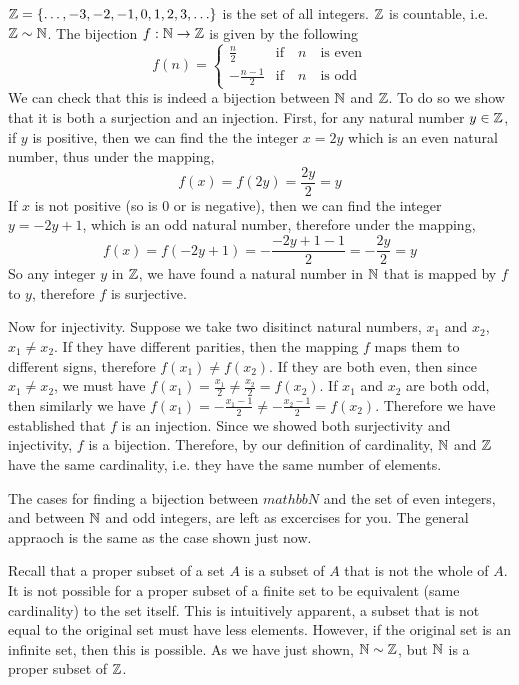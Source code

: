 \documentclass[../../templates/section]{subfiles}
\begin{document}
\begin{example}
$\mathbb{Z} = \{\ldots, -3, -2, -1, 0, 1, 2, 3, \ldots\}$ is the set of all integers.
$\mathbb{Z}$ is countable, i.e. $\mathbb{Z} \sim \mathbb{N}$. The bijection $f:\mathbb{N} \rightarrow \mathbb{Z}$ is
given by the following
\[ 
f(n) =
\begin{cases} 
    \frac{n}{2}      & \text{if} \quad n \quad \text{is even} \\
    -\frac{n - 1}{2} & \text{if} \quad n \quad \text{is odd}
\end{cases}
\]
We can check that this is indeed a bijection between $\mathbb{N}$ and $\mathbb{Z}$.  To do so
we show that it is both a surjection and an injection. First, for any natural
number $y\in \mathbb{Z}$, if $y$ is positive, then we can find the the integer $x = 2y$
which is an even natural number, thus under the mapping,
\[
f(x) = f(2y) = \frac{2y}{2} = y
\]
If $x$ is not positive (so is 0 or is negative), then we can find the integer
$y = -2y + 1$, which is an odd natural number, therefore under the mapping,
\[
f(x) = f(-2y + 1) = -\frac{-2y + 1 - 1}{2} = -\frac{2y}{2} = y
\]
So any integer $y$ in $\mathbb{Z}$, we have found a natural number in $\mathbb{N}$ that is
mapped by $f$ to $y$, therefore $f$ is surjective.

Now for injectivity. Suppose we take two disitinct natural numbers, $x_1$ and
$x_2$, $x_1\neq x_2$. If they have different parities, then the mapping $f$
maps them to different signs, therefore $f(x_1)\neq f(x_2)$. If they are both
even, then since $x_1\neq x_2$, we must have $f(x_1) = \frac{x_1}{2}\neq
\frac{x_2}{2} = f(x_2)$. If $x_1$ and $x_2$ are both odd, then similarly we
have $f(x_1) = -\frac{x_1-1}{2}\neq -\frac{x_2-1}{2} = f(x_2)$. Therefore we
have established that $f$ is an injection. Since we showed both surjectivity
and injectivity, $f$ is a bijection. Therefore, by our definition of
cardinality, $\mathbb{N}$ and $\mathbb{Z}$ have the same cardinality, i.e. they have the same
number of elements.

The cases for finding a bijection between $mathbb{N}$ and the set of even
integers, and between $\mathbb{N}$ and odd integers, are left as excercises for you.
The general appraoch is the same as the case shown just now.
\end{example} 

\begin{remark}
Recall that a proper subset of a set $A$ is a subset of $A$ that is not the
whole of $A$.  It is not possible for a proper subset of a finite set to be
equivalent (same cardinality) to the set itself. This is intuitively apparent,
a subset that is not equal to the original set must have less elements.
However, if the original set is an infinite set, then this is possible. As we
have just shown, $\mathbb{N} \sim \mathbb{Z}$, but $\mathbb{N}$ is a proper subset of $\mathbb{Z}$.
\end{remark}
\end{document}

